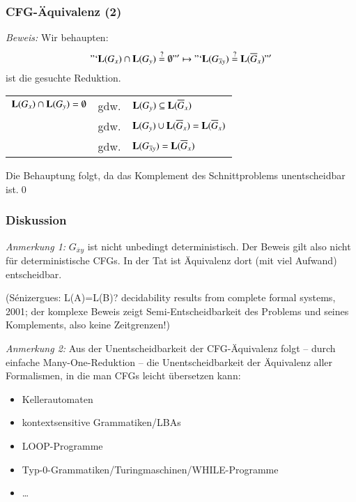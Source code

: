 \documentclass[aspectratio=1610,onlymath]{beamer}
\begin{document}
\begin{frame}[t]\frametitle{CFG-Äquivalenz (2)}


\emph{Beweis:} Wir behaupten: \["`\textbf{\textcolor{black}{L}}(G_x)\cap\textbf{\textcolor{black}{L}}(G_y)\stackrel{?}{=}\emptyset"' \mapsto "`\textbf{\textcolor{black}{L}}(G_{\overline{x}y})\stackrel{?}{=}\textbf{\textcolor{black}{L}}(\overline{G}_x)"'\] ist die gesuchte Reduktion.\bigskip\pause

\begin{tabular}{rrl}
$\textbf{\textcolor{black}{L}}(G_x)\cap\textbf{\textcolor{black}{L}}(G_y)=\emptyset$ \pause
	& gdw. & $\textbf{\textcolor{black}{L}}(G_y)\subseteq\textbf{\textcolor{black}{L}}(\overline{G}_x)$\\\pause
	& gdw. & $\textbf{\textcolor{black}{L}}(G_y)\cup\textbf{\textcolor{black}{L}}(\overline{G}_x)=\textbf{\textcolor{black}{L}}(\overline{G}_x)$\\\pause
	& gdw. & $\textbf{\textcolor{black}{L}}(G_{\overline{x}y})=\textbf{\textcolor{black}{L}}(\overline{G}_x)$\\[1ex]
\end{tabular}

Die Behauptung folgt, da das Komplement des Schnittproblems unentscheidbar ist.\qed

\end{frame}

\begin{frame}\frametitle{Diskussion}

\emph{Anmerkung 1:} $G_{\overline{x}y}$ ist nicht unbedingt deterministisch. Der Beweis
gilt also nicht für deterministische CFGs. In der Tat ist Äquivalenz dort (mit viel Aufwand) entscheidbar.\\[1ex]
{\tiny (S\'{e}nizergues: L(A)=L(B)? decidability results from complete formal systems, 2001; der komplexe Beweis zeigt Semi-Entscheidbarkeit des Problems und seines Komplements, also keine Zeitgrenzen!)

}
\bigskip\pause

\emph{Anmerkung 2:} Aus der Unentscheidbarkeit der CFG-Äquivalenz folgt -- durch einfache Many-One-Reduktion -- die Unentscheidbarkeit der Äquivalenz aller Formalismen, in die man CFGs leicht übersetzen kann:
\begin{itemize}
\item Kellerautomaten
\item kontextsensitive Grammatiken/LBAs
\item LOOP-Programme
\item Typ-0-Grammatiken/Turingmaschinen/WHILE-Programme
\item \ldots
\end{itemize}

\end{frame}
\end{document}
